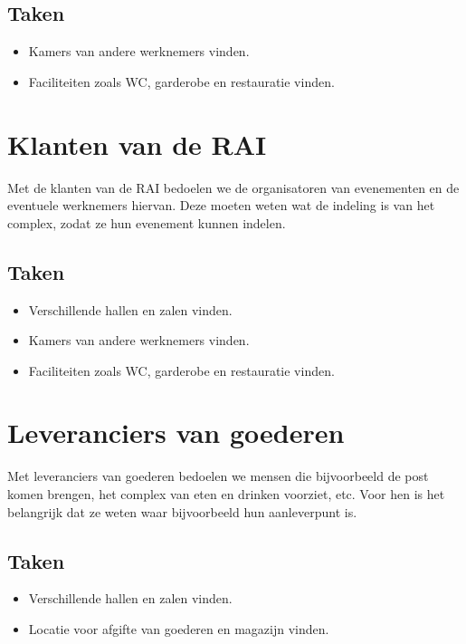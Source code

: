 \subsection*{Taken}

\begin{itemize}
\item Kamers van andere werknemers vinden.
\item Faciliteiten zoals WC, garderobe en restauratie vinden.
\end{itemize}


\section{Klanten van de RAI}

Met de klanten van de RAI bedoelen we de organisatoren van evenementen en de eventuele werknemers hiervan. Deze moeten weten wat de indeling is van het complex, zodat ze hun evenement kunnen indelen.

\subsection*{Taken}

\begin{itemize}
\item Verschillende hallen en zalen vinden.
\item Kamers van andere werknemers vinden.
\item Faciliteiten zoals WC, garderobe en restauratie vinden.
\end{itemize}


\section{Leveranciers van goederen}

Met leveranciers van goederen bedoelen we mensen die bijvoorbeeld de post komen brengen, het complex van eten en drinken voorziet, etc. Voor hen is het belangrijk dat ze weten waar bijvoorbeeld hun aanleverpunt is.

\subsection*{Taken}

\begin{itemize}
\item Verschillende hallen en zalen vinden.
\item Locatie voor afgifte van goederen en magazijn vinden.
\end{itemize}


